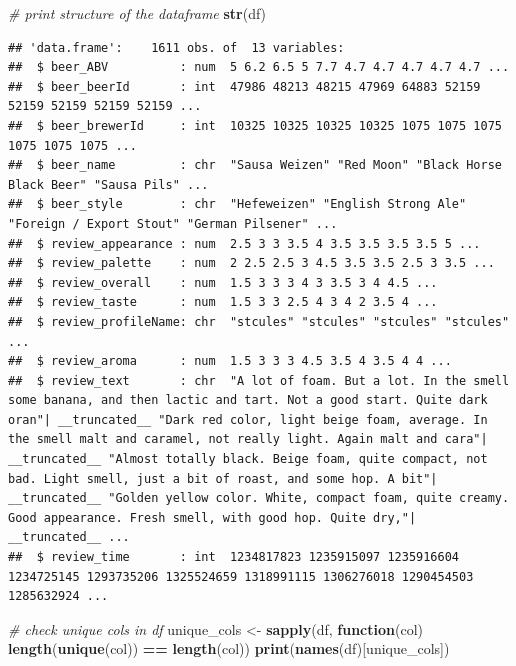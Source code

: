 \documentclass[
  a4paper,
]{article}
\newenvironment{Shaded}{\begin{snugshade}}{\end{snugshade}}
\newcommand{\CommentTok}[1]{\textcolor[rgb]{0.56,0.35,0.01}{\textit{#1}}}
\newcommand{\ControlFlowTok}[1]{\textcolor[rgb]{0.13,0.29,0.53}{\textbf{#1}}}
\newcommand{\FunctionTok}[1]{\textcolor[rgb]{0.13,0.29,0.53}{\textbf{#1}}}
\newcommand{\NormalTok}[1]{#1}
\newcommand{\OtherTok}[1]{\textcolor[rgb]{0.56,0.35,0.01}{#1}}
\newcommand{\SpecialCharTok}[1]{\textcolor[rgb]{0.81,0.36,0.00}{\textbf{#1}}}
\begin{document}
\begin{Shaded}
\begin{Highlighting}[]
\CommentTok{\# print structure of the dataframe}
\FunctionTok{str}\NormalTok{(df)}
\end{Highlighting}
\end{Shaded}

\begin{verbatim}
## 'data.frame':    1611 obs. of  13 variables:
##  $ beer_ABV          : num  5 6.2 6.5 5 7.7 4.7 4.7 4.7 4.7 4.7 ...
##  $ beer_beerId       : int  47986 48213 48215 47969 64883 52159 52159 52159 52159 52159 ...
##  $ beer_brewerId     : int  10325 10325 10325 10325 1075 1075 1075 1075 1075 1075 ...
##  $ beer_name         : chr  "Sausa Weizen" "Red Moon" "Black Horse Black Beer" "Sausa Pils" ...
##  $ beer_style        : chr  "Hefeweizen" "English Strong Ale" "Foreign / Export Stout" "German Pilsener" ...
##  $ review_appearance : num  2.5 3 3 3.5 4 3.5 3.5 3.5 3.5 5 ...
##  $ review_palette    : num  2 2.5 2.5 3 4.5 3.5 3.5 2.5 3 3.5 ...
##  $ review_overall    : num  1.5 3 3 3 4 3 3.5 3 4 4.5 ...
##  $ review_taste      : num  1.5 3 3 2.5 4 3 4 2 3.5 4 ...
##  $ review_profileName: chr  "stcules" "stcules" "stcules" "stcules" ...
##  $ review_aroma      : num  1.5 3 3 3 4.5 3.5 4 3.5 4 4 ...
##  $ review_text       : chr  "A lot of foam. But a lot. In the smell some banana, and then lactic and tart. Not a good start. Quite dark oran"| __truncated__ "Dark red color, light beige foam, average. In the smell malt and caramel, not really light. Again malt and cara"| __truncated__ "Almost totally black. Beige foam, quite compact, not bad. Light smell, just a bit of roast, and some hop. A bit"| __truncated__ "Golden yellow color. White, compact foam, quite creamy. Good appearance. Fresh smell, with good hop. Quite dry,"| __truncated__ ...
##  $ review_time       : int  1234817823 1235915097 1235916604 1234725145 1293735206 1325524659 1318991115 1306276018 1290454503 1285632924 ...
\end{verbatim}

\begin{Shaded}
\begin{Highlighting}[]
\CommentTok{\# check unique cols in df}
\NormalTok{unique\_cols }\OtherTok{\textless{}{-}} \FunctionTok{sapply}\NormalTok{(df, }\ControlFlowTok{function}\NormalTok{(col) }\FunctionTok{length}\NormalTok{(}\FunctionTok{unique}\NormalTok{(col)) }\SpecialCharTok{==} \FunctionTok{length}\NormalTok{(col))}
\FunctionTok{print}\NormalTok{(}\FunctionTok{names}\NormalTok{(df)[unique\_cols])}
\end{Highlighting}
\end{Shaded}
\end{document}
